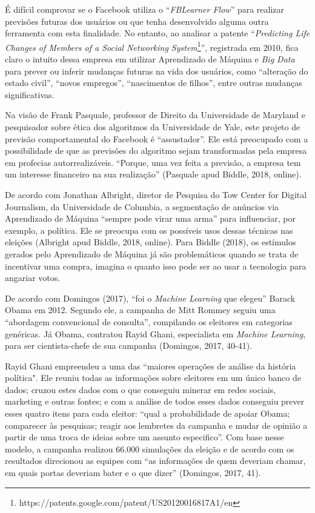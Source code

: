 É difícil comprovar se o Facebook utiliza o ``\emph{FBLearner Flow}''
para realizar previsões futuras dos usuários ou que tenha desenvolvido
alguma outra ferramenta com esta finalidade. No entanto, ao analisar a
patente ``\emph{Predicting Life Changes of Members of a Social
Networking System}\footnote{https://patents.google.com/patent/US20120016817A1/en}'',
registrada em 2010, fica claro o intuito dessa empresa em utilizar
Aprendizado de Máquina e \emph{Big Data} para prever ou inferir mudanças
futuras na vida dos usuários, como ``alteração do estado civil'',
``novos empregos'', ``nascimentos de filhos'', entre outras mudanças
significativas.

Na visão de Frank Pasquale, professor de Direito da Universidade de
Maryland e pesquisador sobre ética dos algoritmos da Universidade de
Yale, este projeto de previsão comportamental do Facebook é
``assustador''. Ele está preocupado com a possibilidade de que as
previsões do algoritmo sejam transformadas pela empresa em profecias
autorrealizáveis. ``Porque, uma vez feita a previsão, a empresa tem um
interesse financeiro na sua realização'' (Pasquale apud Biddle, 2018,
online).

De acordo com Jonathan Albright, diretor de Pesquisa do Tow Center for
Digital Journalism, da Universidade de Columbia, a segmentação de
anúncios via Aprendizado de Máquina ``sempre pode virar uma arma'' para
influenciar, por exemplo, a política. Ele se preocupa com os possíveis
usos dessas técnicas nas eleições (Albright apud Biddle, 2018, online).
Para Biddle (2018), os estímulos gerados pelo Aprendizado de Máquina já
são problemáticos quando se trata de incentivar uma compra, imagina o
quanto isso pode ser ao usar a tecnologia para angariar votos.

De acordo com Domingos (2017), ``foi o \emph{Machine Learning} que
elegeu'' Barack Obama em 2012. Segundo ele, a campanha de Mitt Rommey
seguiu uma ``abordagem convencional de consulta'', compilando os
eleitores em categorias genéricas. Já Obama, contratou Rayid Ghani,
especialista em \emph{Machine Learning}, para ser cientista-chefe de sua
campanha (Domingos, 2017, 40-41).

Rayid Ghani empreendeu a uma das ``maiores operações de análise da
história política". Ele reuniu todas as informações sobre eleitores em
um único banco de dados; cruzou estes dados com o que conseguiu minerar
em redes sociais, marketing e outras fontes; e com a análise de todos
esses dados conseguiu prever esses quatro itens para cada eleitor:
``qual a probabilidade de apoiar Obama; comparecer às pesquisas; reagir
aos lembretes da campanha e mudar de opinião a partir de uma troca de
ideias sobre um assunto especifico''. Com base nesse modelo, a campanha
realizou 66.000 simulações da eleição e de acordo com os resultados
direcionou as equipes com ``as informações de quem deveriam chamar, em
quais portas deveriam bater e o que dizer'' (Domingos, 2017, 41).

